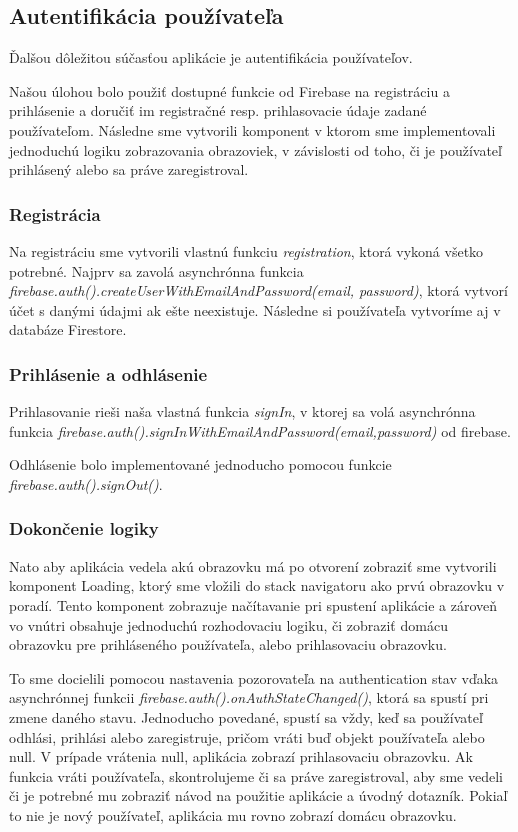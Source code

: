 \subsection{Autentifikácia používateľa}
Ďalšou dôležitou súčasťou aplikácie je autentifikácia používateľov.

Našou úlohou bolo použiť dostupné funkcie od Firebase na registráciu a prihlásenie a doručiť im registračné resp. prihlasovacie údaje zadané používateľom. Následne sme vytvorili komponent v ktorom sme implementovali jednoduchú logiku zobrazovania obrazoviek, v závislosti od toho, či je používateľ prihlásený alebo sa práve zaregistroval.
\subsubsection{Registrácia}
Na registráciu sme vytvorili vlastnú funkciu \textit{registration}, ktorá vykoná všetko potrebné. Najprv sa zavolá asynchrónna funkcia \textit{firebase.auth().createUserWithEmailAndPassword(email, password)}, ktorá vytvorí účet s danými údajmi ak ešte neexistuje. Následne si používateľa vytvoríme aj v databáze Firestore. 
\subsubsection{Prihlásenie a odhlásenie}
Prihlasovanie rieši naša vlastná funkcia \textit{signIn}, v ktorej sa volá asynchrónna funkcia \textit{firebase.auth().signInWithEmailAndPassword(email,password)} od firebase. 

Odhlásenie bolo implementované jednoducho pomocou funkcie \textit{firebase.auth().signOut()}.
\subsubsection{Dokončenie logiky}
Nato aby aplikácia vedela akú obrazovku má po otvorení zobraziť sme vytvorili komponent Loading, ktorý sme vložili do stack navigatoru ako prvú obrazovku v poradí. Tento komponent zobrazuje načítavanie pri spustení aplikácie a zároveň vo vnútri obsahuje jednoduchú rozhodovaciu logiku, či zobraziť domácu obrazovku pre prihláseného používateľa, alebo prihlasovaciu obrazovku. 

To sme docielili pomocou nastavenia pozorovateľa na authentication stav vďaka asynchrónnej funkcii \textit{firebase.auth().onAuthStateChanged()}, ktorá sa spustí pri zmene daného stavu. Jednoducho povedané, spustí sa vždy, keď sa používateľ odhlási, prihlási alebo zaregistruje, pričom vráti buď objekt používateľa alebo null. V prípade vrátenia null, aplikácia zobrazí prihlasovaciu obrazovku. Ak funkcia vráti používateľa, skontrolujeme či sa práve zaregistroval, aby sme vedeli či je potrebné mu zobraziť návod na použitie aplikácie a úvodný dotazník. Pokiaľ to nie je nový používateľ, aplikácia mu rovno zobrazí domácu obrazovku. 
